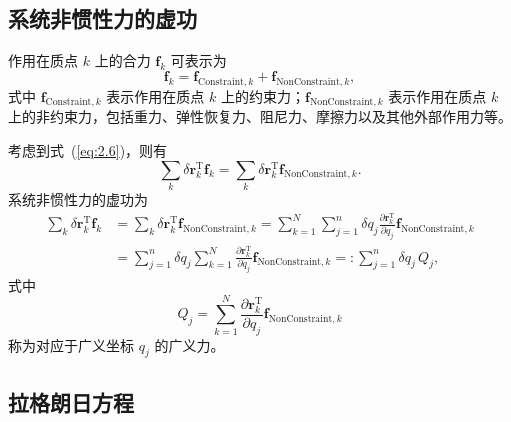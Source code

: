 \subsection{系统非惯性力的虚功}

作用在质点 $k$ 上的合力 $\boldsymbol{f}_k$ 可表示为
\begin{equation}\label{eq:2.16}
\boldsymbol{f}_k = \boldsymbol{f}_{\text{Constraint},k} + \boldsymbol{f}_{\text{NonConstraint},k},
\end{equation}
式中 $\boldsymbol{f}_{\text{Constraint},k}$ 表示作用在质点 $k$ 上的约束力；$\boldsymbol{f}_{\text{NonConstraint},k}$ 表示作用在质点 $k$ 上的非约束力，包括重力、弹性恢复力、阻尼力、摩擦力以及其他外部作用力等。

考虑到式~(\ref{eq:2.6})，则有
\begin{equation*}
\sum_{k} \delta\boldsymbol{r}_k^{\mathrm{T}} \boldsymbol{f}_k = \sum_{k} \delta\boldsymbol{r}_k^{\mathrm{T}} \boldsymbol{f}_{\text{NonConstraint},k}.
\end{equation*}
系统非惯性力的虚功为
\begin{equation}\label{eq:2.17}
\begin{aligned}
\sum_{k} \delta\boldsymbol{r}_k^{\mathrm{T}} \boldsymbol{f}_k
&= \sum_{k} \delta\boldsymbol{r}_k^{\mathrm{T}} \boldsymbol{f}_{\text{NonConstraint},k}
= \sum_{k=1}^{N} \sum_{j=1}^{n} \delta q_j \frac{\partial \boldsymbol{r}_k^{\mathrm{T}}}{\partial q_j} \boldsymbol{f}_{\text{NonConstraint},k} \\
&= \sum_{j=1}^{n} \delta q_j \sum_{k=1}^{N} \frac{\partial \boldsymbol{r}_k^{\mathrm{T}}}{\partial q_j} \boldsymbol{f}_{\text{NonConstraint},k}
=: \sum_{j=1}^{n} \delta q_j \, Q_j,
\end{aligned}
\end{equation}
式中
\begin{equation}\label{eq:2.18}
Q_j = \sum_{k=1}^{N} \frac{\partial \boldsymbol{r}_k^{\mathrm{T}}}{\partial q_j} \boldsymbol{f}_{\text{NonConstraint},k}
\end{equation}
称为对应于广义坐标 $q_j$ 的广义力。

\subsection{拉格朗日方程}

